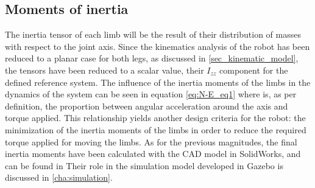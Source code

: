 

\subsection{Moments of inertia} %
\label{par:moments_of_inertia}
The inertia tensor of each limb will be the result of their distribution of masses with respect to the joint axis.
Since the kinematics analysis of the robot has been reduced to a planar case for both legs, as discussed in \ref{sec_kinematic_model}, the tensors have been reduced to a scalar value, their $I_{zz}$ component for the defined reference system.
The influence of the inertia moments of the limbs in the dynamics of the system can be seen in equation \ref{eq:N-E_eq1} where is, as per definition, the proportion between angular acceleration around the axis and torque applied.
This relationship yields another design criteria for the robot: the minimization of the inertia moments of the limbs in order to reduce the required torque applied for moving the limbs.
As for the previous magnitudes, the final inertia moments have been calculated with the CAD model in SolidWorks, and can be found in %
Their role in the simulation model developed in Gazebo is discussed in \ref{cha:simulation}. 


